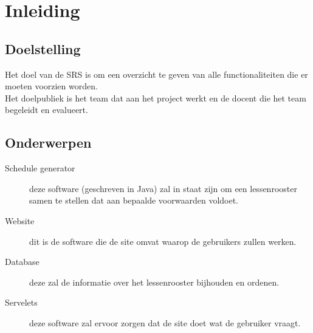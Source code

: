 \documentclass{article}
\begin{document}

\newpage

\newpage

\section{Inleiding}
\subsection{Doelstelling}

Het doel van de SRS is om een overzicht te geven van alle functionaliteiten die er moeten voorzien worden. \\
Het doelpubliek is het team dat aan het project werkt en de docent die het team begeleidt en evalueert. \\

\subsection{Onderwerpen}

\begin{description}
\item[Schedule generator] deze software (geschreven in Java) zal in staat zijn om een lessenrooster samen te stellen dat aan bepaalde voorwaarden voldoet.  \\
\item[Website] dit is de software die de site omvat waarop de gebruikers zullen werken. \\
\item[Database] deze zal de informatie over het lessenrooster bijhouden en ordenen. \\
\item[Servelets] deze software zal ervoor zorgen dat de site doet wat de gebruiker vraagt. 
\end{description}
\end{document}
